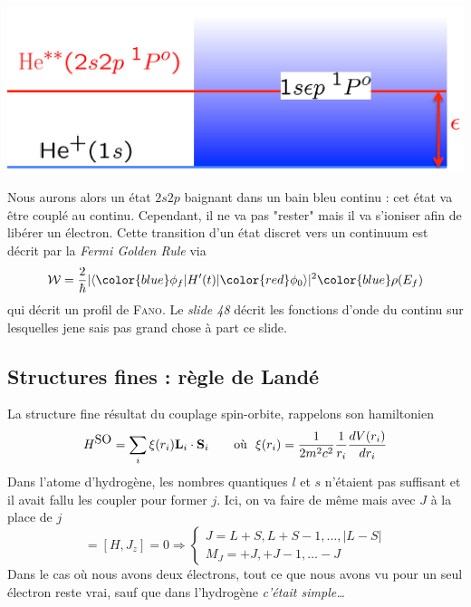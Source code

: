 \begin{center}
\includegraphics[scale=0.5]{ch3/image9}
\end{center}

Nous aurons alors un état $2s2p$ baignant dans un bain bleu continu : cet état va être couplé au 
continu. Cependant, il ne va pas "rester" mais il va s'ioniser afin de libérer un électron. Cette
transition d'un état discret vers un continuum est décrit par la \textit{Fermi Golden Rule} via
\begin{equation}
{\cal{W}}=\frac{2}{\hbar} 
|\langle {\color{blue} \phi_ f} |H'(t)|
{\color{red} \phi_0 } \rangle|^2  {\color{blue} \rho(E_f) }
\end{equation}
qui décrit un profil de \textsc{Fano}. Le \textit{slide 48} décrit les fonctions d'onde du continu
sur lesquelles jene sais pas grand chose à part ce slide.
 
 
\subsection{Structures fines : règle de Landé} 
La structure fine résultat du couplage spin-orbite, rappelons son hamiltonien
\begin{equation}
H^{\mbox{SO}} = \sum_i \xi(r_i) {\bf L}_i \cdot {\bf S}_i\qquad\text{où }\ 
\xi(r_i) = \frac{1}{2 m^2 c^2} \frac{1}{r_i} \frac{dV(r_i)}{dr_i}
\end{equation}
Dans l'atome d'hydrogène, les nombres quantiques $l$ et $s$ n'étaient pas suffisant et il avait 
fallu les coupler pour former $j$. Ici, on va faire de même mais avec $J$ à la place de $j$
\begin{equation}
[H, {\bf J}^2] = [H,J_z] = 0 \Rightarrow 
\left\{
\begin{array}{l}
J = L+S, L+S-1, \ldots, \vert L-S \vert \\
M_J= +J, +J-1, \ldots -J \end{array} \right.
\end{equation}
Dans le cas où nous avons deux électrons, tout ce que nous avons vu pour un seul électron reste vrai,
sauf que dans l'hydrogène \textit{c'était simple\dots}\\

